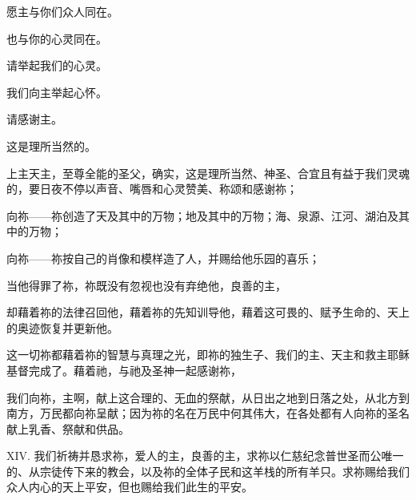 愿主与你们众人同在。\par

\par

也与你的心灵同在。\par

\par

请举起我们的心灵。\par

\par

我们向主举起心怀。\par

\par

请感谢主。\par

\par

这是理所当然的。\par

\par

上主天主，至尊全能的圣父，确实，这是理所当然、神圣、合宜且有益于我们灵魂的，要日夜不停以声音、嘴唇和心灵赞美、称颂和感谢祢；\par

向祢——祢创造了天及其中的万物；地及其中的万物；海、泉源、江河、湖泊及其中的万物；\par

向祢——祢按自己的肖像和模样造了人，并赐给他乐园的喜乐；\par

当他得罪了祢，祢既没有忽视也没有弃绝他，良善的主，\par

却藉着祢的法律召回他，藉着祢的先知训导他，藉着这可畏的、赋予生命的、天上的奥迹恢复并更新他。\par

这一切祢都藉着祢的智慧与真理之光，即祢的独生子、我们的主、天主和救主耶稣基督完成了。藉着祂，与祂及圣神一起感谢祢，\par

我们向祢，主啊，献上这合理的、无血的祭献，从日出之地到日落之处，从北方到南方，万民都向祢呈献；因为祢的名在万民中何其伟大，在各处都有人向祢的圣名献上乳香、祭献和供品。\par

XIV. 我们祈祷并恳求祢，爱人的主，良善的主，求祢以仁慈纪念普世圣而公唯一的、从宗徒传下来的教会，以及祢的全体子民和这羊栈的所有羊只。求祢赐给我们众人内心的天上平安，但也赐给我们此生的平安。\par

